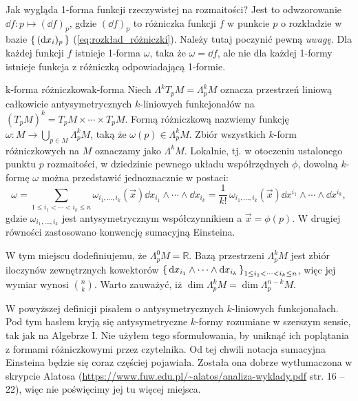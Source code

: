 \documentclass{article}
\begin{document}
Jak wygląda 1-forma funkcji rzeczywistej na rozmaitości? Jest to odwzorowanie $\dd{f}: p\mapsto (\dd{f})_p$, gdzie $(\dd{f})_p$ to różniczka funkcji $f$ w punkcie $p$ o rozkładzie w bazie $\set{(\dd{x_i})_p}$ (\ref{eq:rozkład_różniczki}). Należy tutaj poczynić pewną \textit{uwagę}. Dla każdej funkcji $f$ istnieje 1-forma $\omega$, taka że $\omega=\dd{f}$, ale nie dla każdej 1-formy istnieje funkcja z różniczką odpowiadającą 1-formie. 


\begin{dfn}{k-forma różniczkowa}{k-forma}
  Niech $\Lambda^k T_pM = \Lambda^k_pM$ oznacza przestrzeń liniową całkowicie antysymetrycznych $k$-liniowych funkcjonałów na $(T_pM)^k=T_pM\times\cdots\times T_pM$. Formą różniczkową nazwiemy funkcję $\omega: M\to \bigcup_{p\in M} \Lambda^k_p M$, taką że $\omega(p)\in \Lambda^k_p M$. Zbiór wszystkich $k$-form różniczkowych na $M$ oznaczamy jako $\Lambda^k M$. Lokalnie, tj. w otoczeniu ustalonego punktu $p$ rozmaitości, w dziedzinie pewnego układu współrzędnych $\phi$, dowolną $k$-formę $\omega$ można przedstawić jednoznacznie w postaci:
  \[
  \omega = \sum_{1\leq i_1 < \cdots < i_k \leq n} \omega_{i_1,\ldots, i_k}(\vec{x}) \dd{x}_{i_1}\wedge\cdots\wedge\dd{x}_{i_k} 
  = \frac{1}{k!}\,\omega_{i_1,\ldots, i_k}(\vec{x})\dd{x}^{i_1}\wedge\cdots\wedge\dd{x}^{i_k},
  \]
  gdzie $\omega_{i_1,\ldots, i_k}$ jest antysymetrycznym współczynnikiem a $\vec{x}=\phi(p)$. W drugiej równości zastosowano konwencję sumacyjną Einsteina.
\end{dfn}
W tym miejscu dodefiniujemu, że $\Lambda^0_p M=\mathbb{R}$. Bazą przestrzeni $\Lambda^k_p M$ jest zbiór iloczynów zewnętrznych kowektorów $\set{\dd{x_{i_1}}\wedge\cdots\wedge\dd{x_{i_k}}}_{1\leq i_1<\cdots<i_k\leq n}$, więc jej wymiar wynosi $\binom{n}{k}$. Warto zauważyć, iż $\dim{\Lambda^k_p M}=\dim{\Lambda^{n-k}_p M}$.

W powyższej definicji pisałem o antysymetrycznych $k$-liniowych funkcjonałach. Pod tym hasłem kryją się antysymetryczne $k$-formy rozumiane w szerszym sensie, tak jak na Algebrze I. Nie użyłem tego sformułowania, by uniknąć ich poplątania z formami różniczkowymi przez czytelnika. Od tej chwili notacja sumacyjna Einsteina będzie się coraz częściej pojawiała. Została ona dobrze wytłumaczona w skrypcie Alatosa (\url{https://www.fuw.edu.pl/~alatos/analiza-wyklady.pdf} str. 16 -- 22), więc nie poświęcimy jej tu więcej miejsca.
\end{document}
